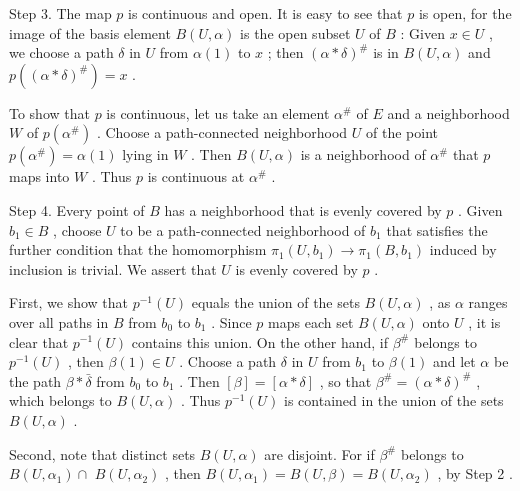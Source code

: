 Step 3. The map \(p\) is continuous and open. It is easy to see that \(p\) is open, for the image of the basis element \(B\left( {U,\alpha }\right)\) is the open subset \(U\) of \(B\) : Given \(x \in  U\) , we choose a path \(\delta\) in \(U\) from \(\alpha \left( 1\right)\) to \(x\) ; then \({\left( \alpha  * \delta \right) }^{\# }\) is in \(B\left( {U,\alpha }\right)\) and \(p\left( {\left( \alpha  * \delta \right) }^{\# }\right)  = x\) .

To show that \(p\) is continuous, let us take an element \({\alpha }^{\# }\) of \(E\) and a neighborhood \(W\) of \(p\left( {\alpha }^{\# }\right)\) . Choose a path-connected neighborhood \(U\) of the point \(p\left( {\alpha }^{\# }\right)  = \alpha \left( 1\right)\) lying in \(W\) . Then \(B\left( {U,\alpha }\right)\) is a neighborhood of \({\alpha }^{\# }\) that \(p\) maps into \(W\) . Thus \(p\) is continuous at \({\alpha }^{\# }\) .

Step 4. Every point of \(B\) has a neighborhood that is evenly covered by \(p\) . Given \({b}_{1} \in  B\) , choose \(U\) to be a path-connected neighborhood of \({b}_{1}\) that satisfies the further condition that the homomorphism \({\pi }_{1}\left( {U,{b}_{1}}\right)  \rightarrow  {\pi }_{1}\left( {B,{b}_{1}}\right)\) induced by inclusion is trivial. We assert that \(U\) is evenly covered by \(p\) .

First, we show that \({p}^{-1}\left( U\right)\) equals the union of the sets \(B\left( {U,\alpha }\right)\) , as \(\alpha\) ranges over all paths in \(B\) from \({b}_{0}\) to \({b}_{1}\) . Since \(p\) maps each set \(B\left( {U,\alpha }\right)\) onto \(U\) , it is clear that \({p}^{-1}\left( U\right)\) contains this union. On the other hand, if \({\beta }^{\# }\) belongs to \({p}^{-1}\left( U\right)\) , then \(\beta \left( 1\right)  \in  U\) . Choose a path \(\delta\) in \(U\) from \({b}_{1}\) to \(\beta \left( 1\right)\) and let \(\alpha\) be the path \(\beta  * \bar{\delta }\) from \({b}_{0}\) to \({b}_{1}\) . Then \(\left\lbrack  \beta \right\rbrack   = \left\lbrack  {\alpha  * \delta }\right\rbrack\) , so that \({\beta }^{\# } = {\left( \alpha  * \delta \right) }^{\# }\) , which belongs to \(B\left( {U,\alpha }\right)\) . Thus \({p}^{-1}\left( U\right)\) is contained in the union of the sets \(B\left( {U,\alpha }\right)\) .

Second, note that distinct sets \(B\left( {U,\alpha }\right)\) are disjoint. For if \({\beta }^{\# }\) belongs to \(B\left( {U,{\alpha }_{1}}\right)  \cap\)  \(B\left( {U,{\alpha }_{2}}\right)\) , then \(B\left( {U,{\alpha }_{1}}\right)  = B\left( {U,\beta }\right)  = B\left( {U,{\alpha }_{2}}\right)\) , by Step 2 .

